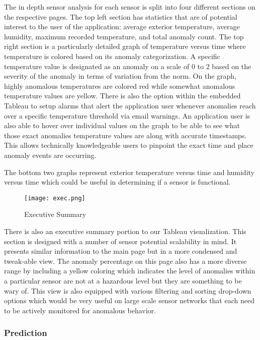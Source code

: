 \documentclass[conference]{IEEEtran}
\begin{document}
The in depth sensor analysis for each sensor is split into four different sections on the respective pages. The top left section has statistics that are of potential interest to the user of the application: average exterior temperature, average humidity, maximum recorded temperature, and total anomaly count. The top right section is a particularly detailed graph of temperature versus time where temperature is colored based on its anomaly categorization. A specific temperature value is designated as an anomaly on a scale of 0 to 2 based on the severity of the anomaly in terms of variation from the norm. On the graph, highly anomalous temperatures are colored red while somewhat anomalous temperature values are yellow. There is also the option within the embedded Tableau to setup alarms that alert the application user whenever anomalies reach over a specific temperature threshold via email warnings. An application user is also able to hover over individual values on the graph to be able to see what those exact anomalies temperature values are along with accurate timestamps. This allows technically knowledgeable users to pinpoint the exact time and place anomaly events are occurring. 

The bottom two graphs represent exterior temperature versus time and humidity versus time which could be useful in determining if a sensor is functional.

\begin{figure}[h]
\texttt{[image: exec.png]}
\centering
\caption{Executive Summary}
\end{figure}

There is also an executive summary portion to our Tableau visualization. This section is designed with a number of sensor potential scalability in mind. It presents similar information to the main page but in a more condensed and tweak-able view. The anomaly percentage on this page also has a more diverse range by including a yellow coloring which indicates the level of anomalies within a particular sensor are not at a hazardous level but they are something to be wary of. This view is also equipped with various filtering and sorting drop-down options which would be very useful on large scale sensor networks that each need to be actively monitored for anomalous behavior.


\subsubsection{Prediction}
\end{document}
